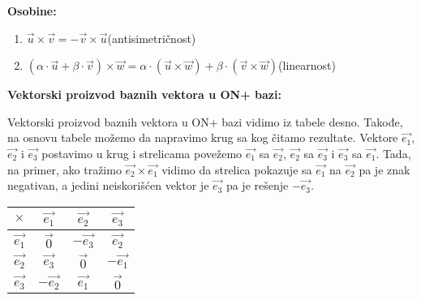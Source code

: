\documentclass[12pt]{article}
\newcommand{\vek}[1]{\overrightarrow{#1}}
\begin{document}
\textbf{Osobine:}
\begin{enumerate}[label=\textit{\arabic*)}]
    \item $\vek{u}\times\vek{v}=-\vek{v}\times\vek{u}$\hspace*{1cm}(antisimetričnost)
    \item $(\alpha\cdot\vek{u}+\beta\cdot\vek{v})\times\vek{w}=\alpha\cdot(\vek{u}\times\vek{w})+\beta\cdot(\vek{v}\times\vek{w})$\hspace*{1cm}(linearnost)
\end{enumerate}
\par

\textbf{Vektorski proizvod baznih vektora u ON+ bazi:}\\[0.1cm]
\noindent
\begin{minipage}{0.65\textwidth}
    \begin{flushleft}
        Vektorski proizvod baznih vektora u ON+ bazi vidimo iz tabele desno.
        Takođe, na osnovu tabele možemo da napravimo krug sa kog čitamo
        rezultate. Vektore $\vek{e_1}$, $\vek{e_2}$ i $\vek{e_3}$ postavimo u
        krug i strelicama povežemo $\vek{e_1}$ sa $\vek{e_2}$, $\vek{e_2}$ sa
        $\vek{e_3}$ i $\vek{e_3}$ sa $\vek{e_1}$. Tada, na primer, ako tražimo
        $\vek{e_2}\times\vek{e_1}$ vidimo da strelica pokazuje sa $\vek{e_1}$
        na $\vek{e_2}$ pa je znak negativan, a jedini neiskorišćen vektor je
        $\vek{e_3}$ pa je rešenje $-\vek{e_3}$.
    \end{flushleft}
\end{minipage}
\hfill
\begin{minipage}{0.3\textwidth}
    \centering
    \begin{tabular}{|c|c|c|c|}
        \hline
        $\times$    & $\vek{e_1}$  & $\vek{e_2}$  & $\vek{e_3}$  \\
        \hline
        $\vek{e_1}$ & $\vek{0}$    & $-\vek{e_3}$ & $\vek{e_2}$  \\
        \hline
        $\vek{e_2}$ & $\vek{e_3}$  & $\vek{0}$    & $-\vek{e_1}$ \\
        \hline
        $\vek{e_3}$ & $-\vek{e_2}$ & $\vek{e_1}$  & $\vek{0}$    \\
        \hline
    \end{tabular}
\end{minipage}
\par
\end{document}
